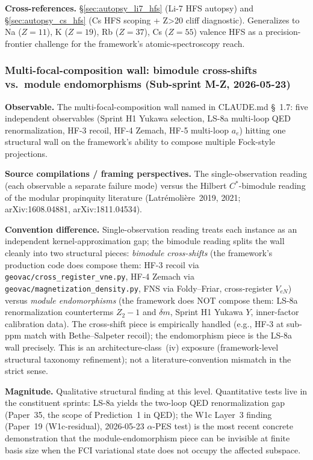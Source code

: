 \documentclass[11pt]{article}
\begin{document}
\textbf{Cross-references.}
\S\ref{sec:autopsy_li7_hfs} (Li-7 HFS autopsy) and
\S\ref{sec:autopsy_cs_hfs} (Cs HFS scoping + Z\textgreater 20 cliff
diagnostic).  Generalizes to Na ($Z=11$), K ($Z=19$), Rb ($Z=37$),
Cs ($Z=55$) valence HFS as a precision-frontier challenge for the
framework's atomic-spectroscopy reach.

\subsubsection{Multi-focal-composition wall: bimodule cross-shifts
vs.\ module endomorphisms (Sub-sprint M-Z, 2026-05-23)}
\label{sec:conv_multifocal_bimodule}

\textbf{Observable.}  The multi-focal-composition wall named in
CLAUDE.md \S~1.7: five independent observables (Sprint H1 Yukawa
selection, LS-8a multi-loop QED renormalization, HF-3 recoil, HF-4
Zemach, HF-5 multi-loop $a_e$) hitting one structural wall on the
framework's ability to compose multiple Fock-style projections.

\textbf{Source compilations / framing perspectives.}  The
single-observation reading (each observable a separate failure mode)
versus the Hilbert $C^*$-bimodule reading of the modular propinquity
literature (Latr\'emoli\`ere~2019, 2021;
arXiv:1608.04881, arXiv:1811.04534).

\textbf{Convention difference.}  Single-observation reading treats
each instance as an independent kernel-approximation gap; the bimodule
reading splits the wall cleanly into two structural pieces:
\emph{bimodule cross-shifts} (the framework's production code does
compose them: HF-3 recoil via \texttt{geovac/cross\_register\_vne.py},
HF-4 Zemach via \texttt{geovac/magnetization\_density.py}, FNS via Foldy--Friar,
cross-register $V_{eN}$) versus \emph{module endomorphisms} (the
framework does NOT compose them: LS-8a renormalization counterterms
$Z_2-1$ and $\delta m$, Sprint H1 Yukawa $Y$, inner-factor calibration
data).  The cross-shift piece is empirically handled (e.g., HF-3 at
sub-ppm match with Bethe--Salpeter recoil); the endomorphism piece is
the LS-8a wall precisely.  This is an architecture-class~(iv) exposure
(framework-level structural taxonomy refinement); not a
literature-convention mismatch in the strict sense.

\textbf{Magnitude.}  Qualitative structural finding at this level.
Quantitative tests live in the constituent sprints: LS-8a yields the
two-loop QED renormalization gap (Paper~35, the scope of Prediction~1 in QED);
the W1c Layer~3 finding (Paper~19 (W1c-residual), 2026-05-23
$\alpha$-PES test) is the most recent concrete demonstration that the
module-endomorphism piece can be invisible at finite basis size when
the FCI variational state does not occupy the affected subspace.
\end{document}
